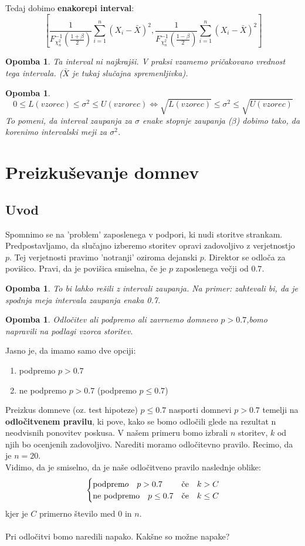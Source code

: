 \documentclass[11pt]{article}
\newtheorem{Opomba}[Izrek]{{\sc Opomba}}
\begin{document}
Tedaj dobimo \textbf{enakorepi interval}:
$$\left[\frac{1}{F_{\chi_n^2}^{-1}\left(\frac{1+\beta}{2}\right)}\sum_{i = 1}^{n}{(X_i - \bar{X})^2}, \frac{1}{F_{\chi_n^2}^{-1}\left(\frac{1-\beta}{2}\right)}\sum_{i = 1}^{n}{(X_i - \bar{X})^2}\right]$$
\begin{Opomba}
	Ta interval ni najkrajši. V praksi vzamemo pričakovano vrednost tega intervala. ($\bar{X}$ je tukaj slučajna spremenljivka).
\end{Opomba}
\begin{Opomba}
	$$0 \le L(vzorec) \le \sigma^2 \le U(vzrorec) \iff \sqrt{L(vzorec)} \le \sigma^2 \le \sqrt{U(vzorec)}$$
	To pomeni, da interval zaupanja za $\sigma$ enake stopnje zaupanja ($\beta$) dobimo tako, da korenimo intervalski meji za $\sigma^2$. 
\end{Opomba}
\section{Preizkuševanje domnev}
\subsection{Uvod}
Spomnimo se na 'problem' zaposlenega v podpori, ki nudi storitve strankam. Predpostavljamo, da slučajno izberemo storitev opravi zadovoljivo z verjetnostjo $p$. Tej verjetnosti pravimo 'notranji' oziroma dejanski $p$.
Direktor se odloča za povišico. Pravi, da je povišica smiselna, če je $p$ zaposlenega večji od $0.7$.
\begin{Opomba}
	To bi lahko rešili z intervali zaupanja. Na primer: zahtevali bi, da je spodnja meja intervala zaupanja enaka 0.7.
\end{Opomba}
\begin{Opomba}
	Odločitev ali podpremo ali zavrnemo domnevo $p> 0.7$,bomo napravili na podlagi vzorca storitev.
\end{Opomba}

Jasno je, da imamo samo dve opciji:
\begin{enumerate}
	\item 
	podpremo $p > 0.7$
	\item
	ne podpremo $p > 0.7$ (podpremo $p\le 0.7$)
\end{enumerate}

Preizkus domneve (oz. test hipoteze) $p\le 0.7$ nasporti domnevi $p>0.7$ temelji na \textbf{odločitvenem pravilu}, ki pove, kako se bomo odločili glede na rezultat n neodvisnih ponovitev poskusa.
V našem primeru bomo izbrali $n$ storitev, $k$ od njih bo ocenjenih zadovoljivo. Narediti moramo odločitevno pravilo. Recimo, da je $n=20$.
\\
Vidimo, da je smiselno, da je naše odločitveno pravilo naslednje oblike:
\[
\begin{cases}
\textnormal{podprem}o\quad p>0.7 & \textnormal{če}\quad k>C\\
\textnormal{ne podpremo} \quad p\le 0.7  & \textnormal{če} \quad k\le C
\end{cases}
\]
kjer je $C$ primerno število med $0$ in $n$.
\\
\\
Pri odločitvi bomo naredili napako. Kakšne so možne napake?
\end{document}
